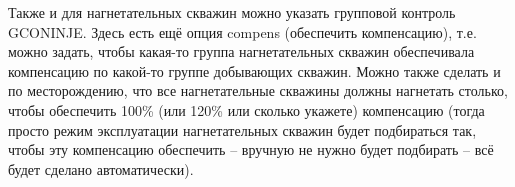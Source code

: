 Также и для нагнетательных скважин можно указать групповой контроль GCONINJE.
Здесь есть ещё опция compens (обеспечить компенсацию), т.е. можно задать, чтобы какая-то группа нагнетательных скважин обеспечивала компенсацию по какой-то группе добывающих скважин.
Можно также сделать и по месторождению, что все нагнетательные скважины должны нагнетать столько, чтобы обеспечить 100\% (или 120\% или сколько укажете) компенсацию (тогда просто режим эксплуатации нагнетательных скважин будет подбираться так, чтобы эту компенсацию обеспечить -- вручную не нужно будет подбирать -- всё будет сделано автоматически).


